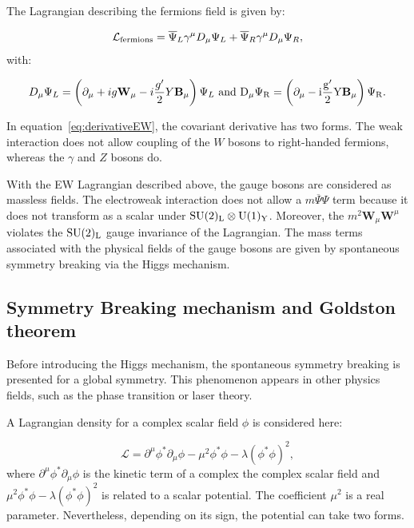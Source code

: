     The Lagrangian describing the fermions field is given by:

    \begin{equation}
      \mathcal{L}_{\rm{fermions}} = \overline{\Psi}_L\gamma^{\mu}D_{\mu}\Psi_L + \overline{\Psi}_R\gamma^{\mu}D_{\mu}\Psi_R,
    \end{equation}
    with:
      
    \begin{equation}
      D_{\mu}\Psi_L = \left( \partial_{\mu} + ig \textbf{W}_{\mu} - i \frac{g'}{2}Y\textbf{B}_{\mu}\right)\Psi_L~\rm{and}~D_{\mu}\Psi_R = \left(\partial_{\mu} - i\frac{g'}{2}Y\textbf{B}_{\mu}\right)\Psi_R.
      \label{eq:derivativeEW}
    \end{equation}
    
    In equation~\ref{eq:derivativeEW}, the covariant derivative has two forms. 
    The weak interaction does not allow coupling of the $W$ bosons to right-handed fermions, whereas the $\gamma$ and $Z$ bosons do.

    With the \gls{EW} Lagrangian described above, the gauge bosons are considered as massless fields.
    The electroweak interaction does not allow a $m\overline{\Psi}\Psi$ term because it does not transform as a scalar under $\rm{SU}(2)_{\rm{L}} \otimes \rm{U}(1)_{\rm{Y}}$.
    Moreover, the $m^2 \textbf{W}_{\mu} \textbf{W}^{\mu}$ violates the $\rm{SU}(2)_{\rm{L}}$ gauge invariance of the Lagrangian.
    The mass terms associated with the physical fields of the gauge bosons are given by spontaneous symmetry breaking via the Higgs mechanism.

      \subsection{Symmetry Breaking mechanism and Goldston theorem}
    
      Before introducing the Higgs mechanism, the spontaneous symmetry breaking is presented for a global symmetry.
      This phenomenon appears in other physics fields, such as the phase transition or laser theory.

      A Lagrangian density for a complex scalar field $\phi$ is considered here:

      \begin{equation}
        \mathcal{L} = \partial^{\mu}\phi^{*} \partial_{\mu}\phi - \mu^2\phi^{*}\phi - \lambda (\phi^{*}\phi)^2,
        \label{eq:ssbLagrangian}
      \end{equation}
      where $\partial^{\mu}\phi^{*} \partial_{\mu}\phi$ is the kinetic term of a complex the complex scalar field and $\mu^2\phi^{*}\phi - \lambda (\phi^{*}\phi)^2$ is related to a scalar potential.
      The coefficient $\mu^2$ is a real parameter. 
      Nevertheless, depending on its sign, the potential can take two forms.


